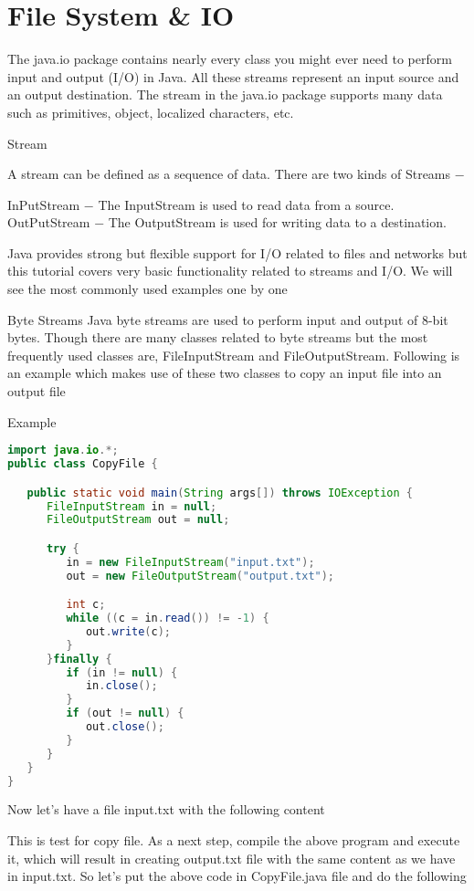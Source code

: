 \chapter{File System & IO}

The java.io package contains nearly every class you might ever need to perform input and output (I/O) in Java. All these streams represent an input source and an output destination. The stream in the java.io package supports many data such as primitives, object, localized characters, etc.

Stream

A stream can be defined as a sequence of data. There are two kinds of Streams −

InPutStream − The InputStream is used to read data from a source.
OutPutStream − The OutputStream is used for writing data to a destination.


Java provides strong but flexible support for I/O related to files and networks but this tutorial covers very basic functionality related to streams and I/O. We will see the most commonly used examples one by one

Byte Streams
Java byte streams are used to perform input and output of 8-bit bytes. Though there are many classes related to byte streams but the most frequently used classes are, FileInputStream and FileOutputStream. Following is an example which makes use of these two classes to copy an input file into an output file

Example

\begin{lstlisting}[language=Java]
import java.io.*;
public class CopyFile {

   public static void main(String args[]) throws IOException {
      FileInputStream in = null;
      FileOutputStream out = null;

      try {
         in = new FileInputStream("input.txt");
         out = new FileOutputStream("output.txt");

         int c;
         while ((c = in.read()) != -1) {
            out.write(c);
         }
      }finally {
         if (in != null) {
            in.close();
         }
         if (out != null) {
            out.close();
         }
      }
   }
}
\end{lstlisting}

Now let's have a file input.txt with the following content

This is test for copy file.
As a next step, compile the above program and execute it, which will result in creating output.txt file with the same content as we have in input.txt. So let's put the above code in CopyFile.java file and do the following

